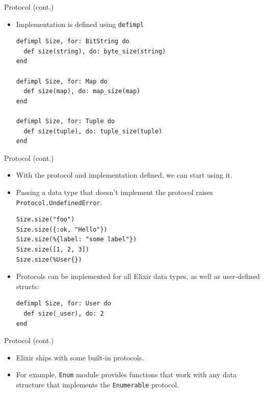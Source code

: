 \documentclass[12pt]{beamer}
\begin{document}
\begin{frame}[fragile]{Protocol (cont.)}
  \begin{itemize}
    \item Implementation is defined using \texttt{defimpl}
          \begin{verbatim}
defimpl Size, for: BitString do
  def size(string), do: byte_size(string)
end

defimpl Size, for: Map do
  def size(map), do: map_size(map)
end

defimpl Size, for: Tuple do
  def size(tuple), do: tuple_size(tuple)
end
  \end{verbatim}
  \end{itemize}
\end{frame}

\begin{frame}[fragile]{Protocol (cont.)}
  \begin{itemize}
    \item With the protocol and implementation defined, we can start using it.
    \item Passing a data type that doesn't implement the protocol raises \texttt{Protocol.UndefinedError}.
          \begin{verbatim}
Size.size("foo")
Size.size({:ok, "Hello"})
Size.size(%{label: "some label"})
Size.size([1, 2, 3])
Size.size(%User{})
  \end{verbatim}
    \item Protocols can be implemented for all Elixir data types, as well as user-defined structs:
          \begin{verbatim}
defimpl Size, for: User do
  def size(_user), do: 2
end
  \end{verbatim}
  \end{itemize}
\end{frame}

\begin{frame}{Protocol (cont.)}
  \begin{itemize}
    \item Elixir ships with some built-in protocols.
    \item For example, \texttt{Enum} module provides functions that work with any data structure that implements the \texttt{Enumerable} protocol.
  \end{itemize}
\end{frame}
\end{document}
